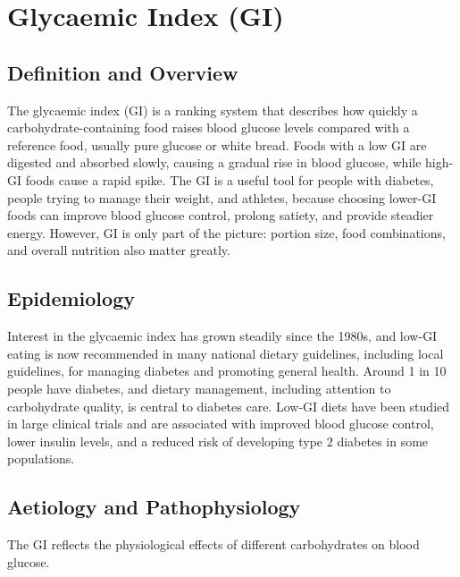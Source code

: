 \chapter{Glycaemic Index (GI)}

\section*{Definition and Overview}
The glycaemic index (GI) is a ranking system that describes how quickly a carbohydrate-containing food raises blood glucose levels compared with a reference food, usually pure glucose or white bread. Foods with a low GI are digested and absorbed slowly, causing a gradual rise in blood glucose, while high-GI foods cause a rapid spike. The GI is a useful tool for people with diabetes, people trying to manage their weight, and athletes, because choosing lower-GI foods can improve blood glucose control, prolong satiety, and provide steadier energy. However, GI is only part of the picture: portion size, food combinations, and overall nutrition also matter greatly.

\section*{Epidemiology}
Interest in the glycaemic index has grown steadily since the 1980s, and low-GI eating is now recommended in many national dietary guidelines, including local guidelines, for managing diabetes and promoting general health. Around 1 in 10 people have diabetes, and dietary management, including attention to carbohydrate quality, is central to diabetes care. Low-GI diets have been studied in large clinical trials and are associated with improved blood glucose control, lower insulin levels, and a reduced risk of developing type 2 diabetes in some populations.

\section*{Aetiology and Pathophysiology}
The GI reflects the physiological effects of different carbohydrates on blood glucose.

